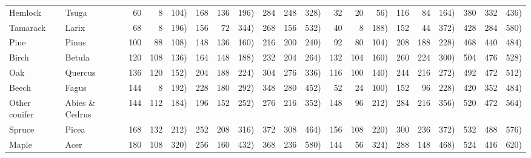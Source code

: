 \begin{landscape}
\begin{table}
\begin{center}
\begin{tabular}{ll*{6}{r@{ (}r@{, }r}}
%
Hemlock& Tsuga&60 &   8 & 104) & 168 & 136 & 196) & 284 & 248 & 328)&32 &  20 &  56) & 116 &  84 & 164) & 380 & 332 & 436) \\
Tamarack& Larix &68 &   8 & 196) & 156 &  72 & 344) & 268 & 156 & 532)&40 &   8 & 188) & 152 &  44 & 372) & 428 & 284 & 580) \\
Pine & Pinus & 100 &  88 & 108) & 148 & 136 & 160) & 216 & 200 & 240)&92 &  80 & 104) & 208 & 188 & 228) & 468 & 440 & 484) \\
Birch & Betula & 120 & 108 & 136) & 164 & 148 & 188) & 232 & 204 & 264)&132 & 104 & 160) & 260 & 224 & 300) & 504 & 476 & 528) \\
Oak & Quercus & 136 & 120 & 152) & 204 & 188 & 224) & 304 & 276 & 336)&116 & 100 & 140) & 244 & 216 & 272) & 492 & 472 & 512) \\
Beech & Fagus & 144 &   8 & 192) & 228 & 180 & 292) & 348 & 280 & 452)&52 &  24 & 100) & 152 &  96 & 228) & 420 & 352 & 484) \\
Other conifer & Abies \& Cedrus & 144 & 112 & 184) & 196 & 152 & 252) & 276 & 216 & 352)&148 &  96 & 212) & 284 & 216 & 356) & 520 & 472 & 564) \\
Spruce & Picea & 168 & 132 & 212) & 252 & 208 & 316) & 372 & 308 & 464)&156 & 108 & 220) & 300 & 236 & 372) & 532 & 488 & 576) \\
Maple & Acer & 180 & 108 & 320) & 256 & 160 & 432) & 368 & 236 & 580)&144 &  56 & 324) & 288 & 148 & 468) & 524 & 416 & 620) \\

\end{tabular}
\end{center}
\end{table}
\end{landscape}
